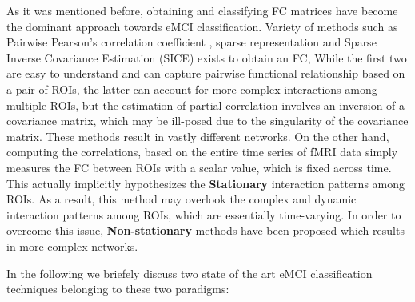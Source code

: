 \documentclass[preprint,12pt]{elsarticle}
\begin{document}
%	
As it was mentioned before, obtaining and classifying FC matrices have become the dominant approach towards eMCI classification. 
Variety of methods such as Pairwise Pearson’s correlation coefficient \cite{r10, r11}, sparse representation \cite{r10, r12, r13}  and Sparse Inverse Covariance Estimation (SICE)\cite{r15} exists to obtain an FC,
While the first two are easy to understand and can capture pairwise functional relationship based on a pair of ROIs, the latter can account for more complex interactions among multiple ROIs, but the estimation of partial correlation involves an inversion of a covariance matrix, which may be ill-posed due to the singularity of the covariance matrix. 
These methods result in vastly different networks\cite{r35}. On the other hand, computing the correlations, based on the entire time series of fMRI data simply measures the FC between ROIs with a scalar value, which is fixed across time. This actually implicitly hypothesizes the \textbf{Stationary} interaction patterns among ROIs. As a result, this method may overlook the complex and dynamic interaction patterns among ROIs, which are essentially time-varying. In order to overcome this issue, \textbf{Non-stationary} methods have been proposed which results in more complex networks\cite{r16}\textendash \cite{r19}.


In the following we briefely discuss two state of the art eMCI classification techniques belonging to these two paradigms:
\end{document}
